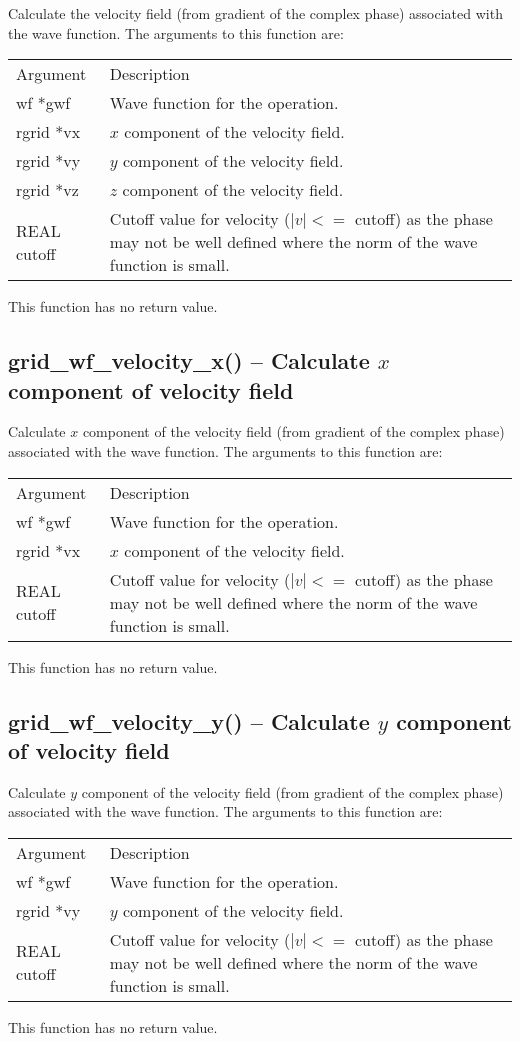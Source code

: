 \documentclass[12pt,letterpaper]{report}
\begin{document}
Calculate the velocity field (from gradient of the complex phase) associated with the wave function. The arguments to this function are:
\begin{longtable}{p{} p{}}
Argument & Description\\
\cline{1-2}
wf *gwf & Wave function for the operation.\\
rgrid *vx & $x$ component of the velocity field.\\
rgrid *vy & $y$ component of the velocity field.\\
rgrid *vz & $z$ component of the velocity field.\\
REAL cutoff & Cutoff value for velocity ($|v| <=$ cutoff) as the phase may not be well defined where the norm of the wave function is small.\\
\end{longtable}
\noindent
This function has no return value.

\subsection{grid\_wf\_velocity\_x() -- Calculate $x$ component of velocity field}

Calculate $x$ component of the velocity field (from gradient of the complex phase) associated with the wave function. The arguments to this function are:
\begin{longtable}{p{} p{}}
Argument & Description\\
\cline{1-2}
wf *gwf & Wave function for the operation.\\
rgrid *vx & $x$ component of the velocity field.\\
REAL cutoff & Cutoff value for velocity ($|v| <=$ cutoff) as the phase may not be well defined where the norm of the wave function is small.\\
\end{longtable}
\noindent
This function has no return value.

\subsection{grid\_wf\_velocity\_y() -- Calculate $y$ component of velocity field}

Calculate $y$ component of the velocity field (from gradient of the complex phase) associated with the wave function. The arguments to this function are:
\begin{longtable}{p{} p{}}
Argument & Description\\
\cline{1-2}
wf *gwf & Wave function for the operation.\\
rgrid *vy & $y$ component of the velocity field.\\
REAL cutoff & Cutoff value for velocity ($|v| <=$ cutoff) as the phase may not be well defined where the norm of the wave function is small.\\
\end{longtable}
\noindent
This function has no return value.
\end{document}
